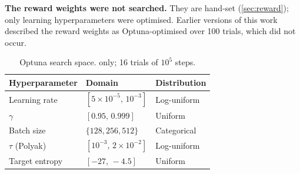 \textbf{The reward weights were not searched.} They are hand-set
(\cref{sec:reward}); only learning hyperparameters were optimised. Earlier
versions of this work described the reward weights as Optuna-optimised over 100
trials, which did not occur.

\begin{table}[H]
  \centering
  \caption{Optuna search space. \SAC only; 16 trials of $10^5$ steps.}
  \label{tab:optuna_space}
  \small
  \begin{tabularx}{\textwidth}{@{} L{4.2cm} L{4.2cm} X @{}}
    \toprule
    \textbf{Hyperparameter} & \textbf{Domain} & \textbf{Distribution} \\
    \midrule
    Learning rate        & $[5\times10^{-5},\, 10^{-3}]$   & Log-uniform \\
    $\gamma$             & $[0.95,\, 0.999]$               & Uniform \\
    Batch size           & $\{128, 256, 512\}$             & Categorical \\
    $\tau$ (Polyak)      & $[10^{-3},\, 2\times 10^{-2}]$  & Log-uniform \\
    Target entropy       & $[-27,\, -4.5]$                 & Uniform \\
    \bottomrule
  \end{tabularx}
\end{table}

